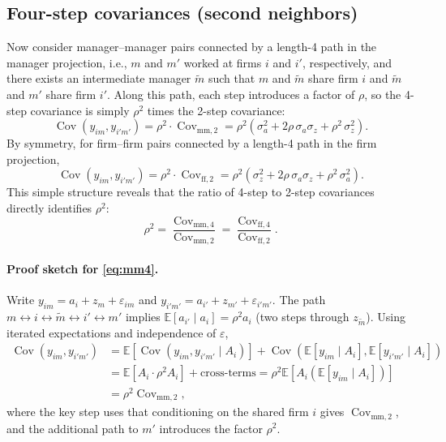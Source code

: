 \documentclass[11pt]{article}
\begin{document}
\subsection{Four-step covariances (second neighbors)}
Now consider manager--manager pairs connected by a length-4 path in the manager projection, i.e., $m$ and $m'$ worked at firms $i$ and $i'$, respectively, and there exists an intermediate manager $\tilde m$ such that $m$ and $\tilde m$ share firm $i$ and $\tilde m$ and $m'$ share firm $i'$. Along this path, each step introduces a factor of $\rho$, so the 4-step covariance is simply $\rho^2$ times the 2-step covariance:
\begin{equation}
\label{eq:mm4}
 \operatorname{Cov}(y_{im}, y_{i'm'}) = \rho^2 \cdot \operatorname{Cov}_{\text{mm},2} = \rho^2(\sigma_a^2 + 2\rho\,\sigma_a\sigma_z + \rho^2\,\sigma_z^2).
\end{equation}
By symmetry, for firm--firm pairs connected by a length-4 path in the firm projection,
\begin{equation}
\label{eq:ff4}
 \operatorname{Cov}(y_{im}, y_{i'm'}) = \rho^2 \cdot \operatorname{Cov}_{\text{ff},2} = \rho^2(\sigma_z^2 + 2\rho\,\sigma_a\sigma_z + \rho^2\,\sigma_a^2).
\end{equation}
This simple structure reveals that the ratio of 4-step to 2-step covariances directly identifies $\rho^2$:
\begin{equation}
\label{eq:rho-ratio}
 \rho^2 = \frac{\operatorname{Cov}_{\text{mm},4}}{\operatorname{Cov}_{\text{mm},2}} = \frac{\operatorname{Cov}_{\text{ff},4}}{\operatorname{Cov}_{\text{ff},2}}.
\end{equation}

\paragraph{Proof sketch for \eqref{eq:mm4}.} Write $y_{im}=a_i+z_m+\varepsilon_{im}$ and $y_{i'm'}=a_{i'}+z_{m'}+\varepsilon_{i'm'}$. The path $m \leftrightarrow i \leftrightarrow \tilde m \leftrightarrow i' \leftrightarrow m'$ implies $\mathbb{E}[a_{i'}\mid a_i] = \rho^2 a_i$ (two steps through $z_{\tilde m}$). Using iterated expectations and independence of $\varepsilon$,
\begin{align*}
 \operatorname{Cov}(y_{im}, y_{i'm'}) &= \mathbb{E}[\operatorname{Cov}(y_{im}, y_{i'm'} \mid A_i)] + \operatorname{Cov}(\mathbb{E}[y_{im}\mid A_i], \mathbb{E}[y_{i'm'}\mid A_i]) \\
 &= \mathbb{E}[A_i \cdot \rho^2 A_i] + \text{cross-terms} = \rho^2 \mathbb{E}[A_i(\mathbb{E}[y_{im}\mid A_i])] \\
 &= \rho^2 \operatorname{Cov}_{\text{mm},2},
\end{align*}
where the key step uses that conditioning on the shared firm $i$ gives $\operatorname{Cov}_{\text{mm},2}$, and the additional path to $m'$ introduces the factor $\rho^2$.
\end{document}
